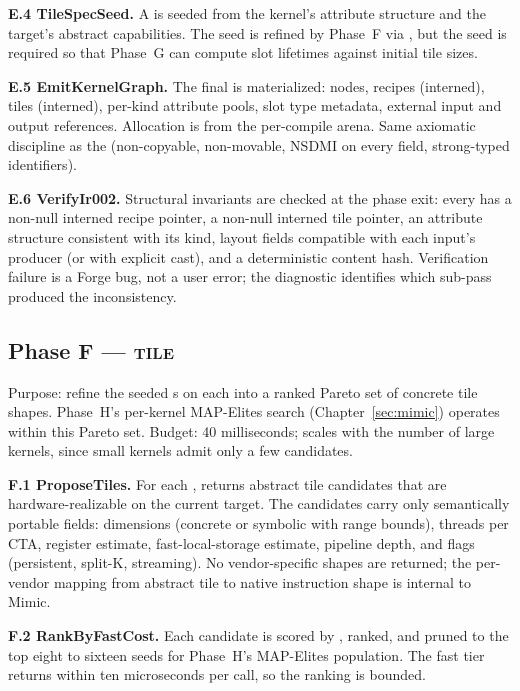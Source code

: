 \textbf{E.4 TileSpecSeed.}
A  is seeded from the kernel's attribute structure and the target's abstract capabilities.
The seed is refined by Phase~F via , but the seed is required so that Phase~G can compute slot lifetimes against initial tile sizes.

\textbf{E.5 EmitKernelGraph.}
The final   is materialized: nodes, recipes (interned), tiles (interned), per-kind attribute pools, slot type metadata, external input and output references.
Allocation is from the per-compile arena.
Same axiomatic discipline as the   (non-copyable, non-movable, NSDMI on every field, strong-typed identifiers).

\textbf{E.6 VerifyIr002.}
Structural invariants are checked at the phase exit: every  has a non-null interned recipe pointer, a non-null interned tile pointer, an attribute structure consistent with its kind, layout fields compatible with each input's producer (or with explicit cast), and a deterministic content hash.
Verification failure is a Forge bug, not a user error; the diagnostic identifies which sub-pass produced the inconsistency.

\subsection{Phase F --- \textsc{tile}}
\label{sec:forge-phase-f}

Purpose: refine the seeded s on each  into a ranked Pareto set of concrete tile shapes.
Phase~H's per-kernel MAP-Elites search (Chapter~\ref{sec:mimic}) operates within this Pareto set.
Budget: 40 milliseconds; scales with the number of large kernels, since small kernels admit only a few candidates.

\textbf{F.1 ProposeTiles.}
For each ,  returns abstract tile candidates that are hardware-realizable on the current target.
The candidates carry only semantically portable fields: dimensions (concrete or symbolic with range bounds), threads per CTA, register estimate, fast-local-storage estimate, pipeline depth, and flags (persistent, split-K, streaming).
No vendor-specific shapes are returned; the per-vendor mapping from abstract tile to native instruction shape is internal to Mimic.

\textbf{F.2 RankByFastCost.}
Each candidate is scored by , ranked, and pruned to the top eight to sixteen seeds for Phase~H's MAP-Elites population.
The fast tier returns within ten microseconds per call, so the ranking is bounded.

